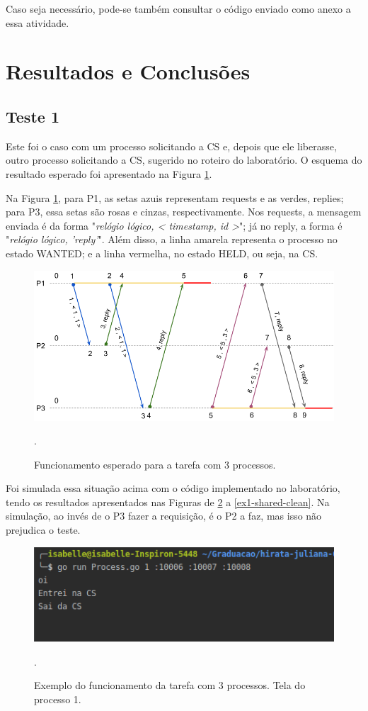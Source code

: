 \documentclass[conference]{IEEEtran}
\begin{document}
	Caso seja necessário, pode-se também consultar o código enviado como anexo a essa atividade. 

\section{Resultados e Conclusões} \label{results}

\subsection{Teste 1}

	Este foi o caso com um processo solicitando a CS e, depois que ele liberasse, outro processo solicitando a CS, sugerido no roteiro do laboratório. O esquema do resultado esperado foi apresentado na Figura \ref{ex1}.
	
	Na Figura \ref{ex1}, para P1, as setas azuis representam requests e as verdes, replies; para P3, essa setas são rosas e cinzas, respectivamente. Nos requests, a mensagem enviada é da forma "\textit{relógio lógico, < timestamp, id >}"; já no reply, a forma é "\textit{relógio lógico, 'reply'}". Além disso, a linha amarela representa o processo no estado WANTED; e a linha vermelha, no estado HELD, ou seja, na CS.
	
\begin{figure}[H]
\centering
\centerline{\includegraphics[scale=0.3]{imagens/ex1.png}}
\caption{Funcionamento esperado para a tarefa com 3 processos.}.
\label{ex1}
\end{figure}

	Foi simulada essa situação acima com o código implementado no laboratório, tendo os resultados apresentados nas Figuras de \ref{ex1-proc1-clean} a \ref{ex1-shared-clean}. Na simulação, ao invés de o P3 fazer a requisição, é o P2 a faz, mas isso não prejudica o teste.
	
\begin{figure}[H]
\centering
\centerline{\includegraphics[scale=0.5]{imagens/ex1-proc1-clean.png}}
\caption{Exemplo do funcionamento da tarefa com 3 processos. Tela do processo 1.}.
\label{ex1-proc1-clean}
\end{figure}
\end{document}
